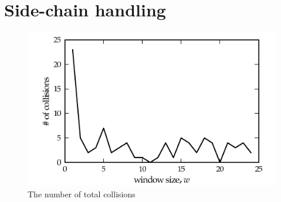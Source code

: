 \section{Side-chain handling}
\label{sec:evaluation_handling_side-chains}
\begin{figure}
	\centering
	\hspace*{-3.5mm}\includegraphics[width=1.1\columnwidth]{figures/plot_collisions}
	\caption{The number of total collisions }
\end{figure}




